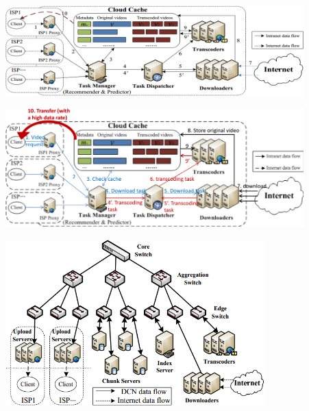 \documentclass{beamer}
\begin{document}
\begin{frame}
\begin{center}
\includegraphics[width=11.5cm]{fig/cloud-transcoder_arch.png}
\end{center}
\end{frame}
\begin{frame}
\begin{center}
\includegraphics[width=11.5cm]{fig/cloud-transcoder_arch_details.png}
\end{center}
\end{frame}
\begin{frame}
\begin{center}
\includegraphics[width=10cm]{fig/cloud-cache_hardware.png}
\end{center}
\end{frame}
\end{document}
